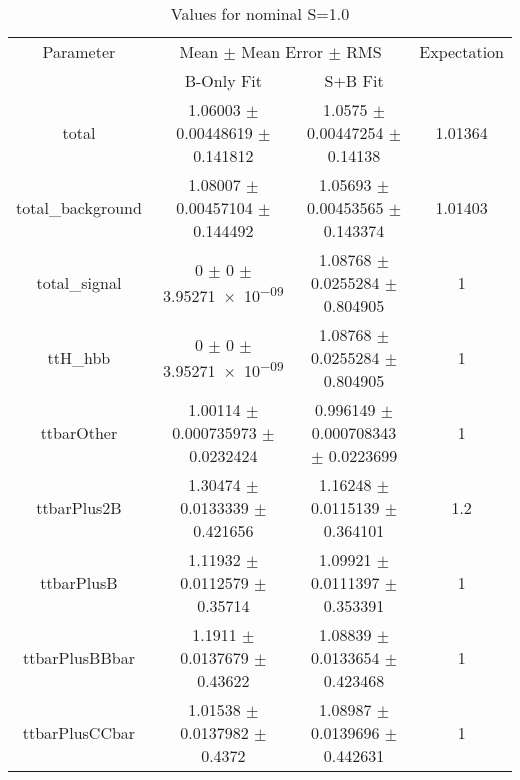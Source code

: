 \begin{table}
\centering
\caption{Values for nominal S=1.0}
\begin{tabular}{cccc}
\toprule
Parameter & \multicolumn{2}{c}{Mean $\pm$ Mean Error $\pm$ RMS} & Expectation\\
 & B-Only Fit & S+B Fit & \\
\midrule
total & \num{1.06003} $\pm$ \num{0.00448619} $\pm$ \num{0.141812} & \num{1.0575} $\pm$ \num{0.00447254} $\pm$ \num{0.14138} & \num{1.01364}\\
total\_background & \num{1.08007} $\pm$ \num{0.00457104} $\pm$ \num{0.144492} & \num{1.05693} $\pm$ \num{0.00453565} $\pm$ \num{0.143374} & \num{1.01403}\\
total\_signal & \num{0} $\pm$ \num{0} $\pm$ \num{3.95271e-09} & \num{1.08768} $\pm$ \num{0.0255284} $\pm$ \num{0.804905} & \num{1}\\
ttH\_hbb & \num{0} $\pm$ \num{0} $\pm$ \num{3.95271e-09} & \num{1.08768} $\pm$ \num{0.0255284} $\pm$ \num{0.804905} & \num{1}\\
ttbarOther & \num{1.00114} $\pm$ \num{0.000735973} $\pm$ \num{0.0232424} & \num{0.996149} $\pm$ \num{0.000708343} $\pm$ \num{0.0223699} & \num{1}\\
ttbarPlus2B & \num{1.30474} $\pm$ \num{0.0133339} $\pm$ \num{0.421656} & \num{1.16248} $\pm$ \num{0.0115139} $\pm$ \num{0.364101} & \num{1.2}\\
ttbarPlusB & \num{1.11932} $\pm$ \num{0.0112579} $\pm$ \num{0.35714} & \num{1.09921} $\pm$ \num{0.0111397} $\pm$ \num{0.353391} & \num{1}\\
ttbarPlusBBbar & \num{1.1911} $\pm$ \num{0.0137679} $\pm$ \num{0.43622} & \num{1.08839} $\pm$ \num{0.0133654} $\pm$ \num{0.423468} & \num{1}\\
ttbarPlusCCbar & \num{1.01538} $\pm$ \num{0.0137982} $\pm$ \num{0.4372} & \num{1.08987} $\pm$ \num{0.0139696} $\pm$ \num{0.442631} & \num{1}\\
\bottomrule
\end{tabular}
\end{table}